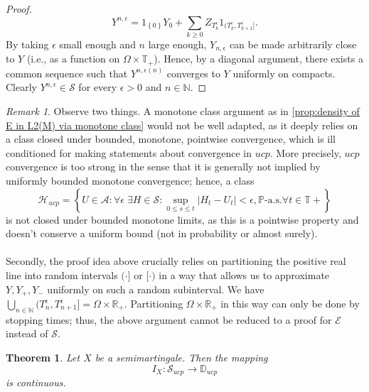 \documentclass[11pt,a4paper,twoside,openany]{report}
\theoremstyle{plain} %
\newtheorem{theorem}{Theorem}[chapter]
\theoremstyle{definition} %
\theoremstyle{remark} %
\newtheorem{remark}[remark]{Remark}
\begin{document}
\begin{proof}
    \begin{equation}
        Y^{n,\epsilon}=1_{\left\{0\right\}}Y_0+\sum_{k\geq 0}Z_{T_k^{\epsilon}}1_{(T_{k}^{\epsilon},T_{k+1}^{\epsilon}]}.
    \end{equation}
    By taking \(\epsilon\) small enough and \(n\) large enough, \(Y_{n,\epsilon}\) can be made arbitrarily close to \(Y\) (i.e., as a function on \(\Omega\times \mathbb{T}_+\)). Hence, by a diagonal argument, there exists a common sequence such that \(Y^{n,\epsilon(n)}\) converges to \(Y\) uniformly on compacts.  Clearly \(Y^{n,\epsilon}\in\mathcal{S}\) for every \(\epsilon>0\) and \(n\in\mathbb{N}\).
\end{proof}
\begin{remark}
Observe two things. A monotone class argument as in \cref{prop:density of E in L2(M) via monotone class} would not be well adapted, as it deeply relies on a class closed under bounded, monotone, pointwise convergence, which is ill conditioned for making statements about convergence in \(ucp\). More precisely, \(ucp\) convergence is too strong in the sense that it is generally not implied by uniformly bounded monotone convergence; hence, a class \begin{equation}
    \mathcal{H}_{ucp}=\left\{ U \in \mathcal{A}:\forall \epsilon\;\exists H\in\mathcal{S}:\sup_{0\leq s\leq t}|H_t-U_t|<\epsilon, \mathbb{P}\text{-a.s.} \forall t\in\mathbb{T}+\right\}
\end{equation} 
is not closed under bounded monotone limits, as this is a pointwise property and doesn't conserve a uniform bound (not in probability or almost surely). \\\\
Secondly, the proof idea above crucially relies on partitioning the positive real line into random intervals \((\cdot]\) or \([\cdot)\) in a way that allows us to approximate \(Y,Y_+,Y_-\) uniformly on such a random subinterval. We have \(\bigcup_{n\in\mathbb{N}} (T_n^{\epsilon},T_{n+1}^{\epsilon}]=\Omega\times\mathbb{R}_+\). Partitioning \(\Omega\times\mathbb{R}_+\) in this way can only be done by stopping times; thus, the above argument cannot be reduced to a proof for \(\mathcal{E}\) instead of \(\mathcal{S}\).
\end{remark}
\begin{theorem}\label{thm:ucp continuity of general stochastic integral}
    Let \(X\) be a semimartingale. Then the mapping 
    \begin{equation}
        I_X:\mathcal{S}_{ucp}\to\mathbb{D}_{ucp} 
    \end{equation}
    is continuous. 
\end{theorem}
\end{document}
